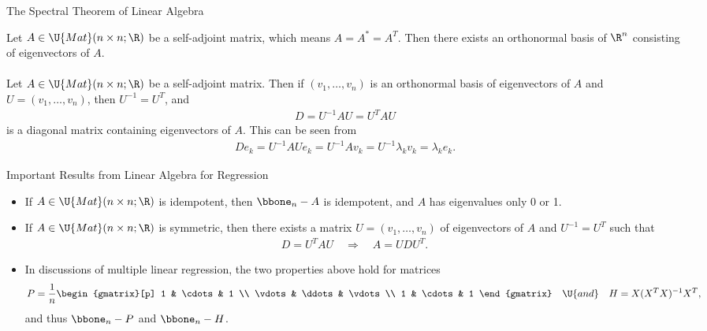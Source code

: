 \begin{frame}{The Spectral Theorem of Linear Algebra}

\justifying
{} Let $A \in \U{Mat}(n\times n; \R)$ be a self-adjoint matrix, which means $A = A^* = A^T$. Then there exists an orthonormal basis of $\R^n$ consisting of eigenvectors of $A$. \\
~\\
 Let $A \in \U{Mat}(n\times n; \R)$ be a self-adjoint matrix. Then if $(v_1, \ldots, v_n)$ is an orthonormal basis of eigenvectors of $A$ and $U = (v_1, \ldots, v_n)$, then $U^{-1} = U^T$, and
\begin{align*}
D = U^{-1}AU = U^{T} AU
\end{align*}
is a diagonal matrix containing eigenvectors of $A$. This can be seen from
\begin{align*}
De_k = U^{-1}AUe_k = U^{-1}Av_k = U^{-1}\lambda_k v_k = \lambda_k e_k.
\end{align*}

\end{frame}

\begin{frame}{Important Results from Linear Algebra for Regression}

\begin{itemize}
	\justifying
	\item If $A\in \U{Mat}(n\times n; \R)$ is idempotent, then $\bbone_n-A$ is idempotent, and $A$ has eigenvalues only 0 or 1.
	\item If $A\in \U{Mat}(n\times n; \R)$ is symmetric, then there exists a matrix $U = (v_1, \ldots, v_n)$ of eigenvectors of $A$ and $U^{-1} = U^T$ such that
	\begin{align*}
	D = U^{T}AU \quad\Rightarrow\quad A = UDU^T.
	\end{align*}
	\item In discussions of multiple linear regression, the two properties above hold for matrices
	\begin{align*}
	P = \frac{1}{n}\begin{gmatrix}[p]
	1 & \cdots & 1 \\
	\vdots & \ddots & \vdots \\
	1 & \cdots & 1
	\end{gmatrix} \quad \U{and}\quad H = X(X^TX)^{-1}X^T,
	\end{align*}
	and thus $\bbone_n - P$ and $\bbone_n - H$.
\end{itemize}

\end{frame}


